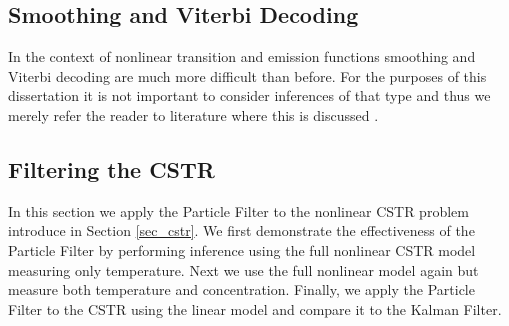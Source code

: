 \subsection{Smoothing and Viterbi Decoding}
In the context of nonlinear transition and emission functions smoothing and Viterbi decoding are much more difficult than before. For the purposes of this dissertation it is not important to consider inferences of that type and thus we merely refer the reader to literature where this is discussed \cite{barber}\cite{pftut}\cite{gsf1}\cite{murphy1}\cite{murphy2}.

\subsection{Filtering the CSTR}
In this section we apply the Particle Filter to the nonlinear CSTR problem introduce in Section \ref{sec_cstr}. We first demonstrate the effectiveness of the Particle Filter by performing inference using the full nonlinear CSTR model measuring only temperature. Next we use the full nonlinear model again but measure both temperature and concentration. Finally, we apply the Particle Filter to the CSTR using the linear model and compare it to the Kalman Filter.

